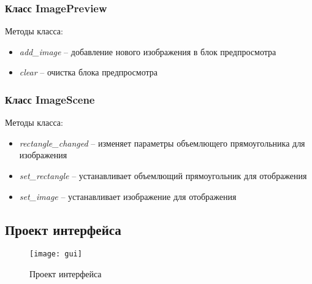 \subsubsection{Класс ImagePreview}
Методы класса:
\begin{itemize}
\item \textit{add\_image} -- добавление нового изображения в блок предпросмотра
\item \textit{clear} -- очистка блока предпросмотра
\end{itemize}

\subsubsection{Класс ImageScene}
Методы класса:
\begin{itemize}
\item \textit{rectangle\_changed} -- изменяет параметры объемлющего прямоугольника для изображения
\item \textit{set\_rectangle} -- устанавливает объемлющий прямоугольник для отображения
\item \textit{set\_image} -- устанавливает изображение для отображения
\end{itemize}

\subsection{Проект интерфейса}
\renewcommand{\figurename}{Рис.}
\begin{figure}[h]
\center
\texttt{[image: gui]}
\caption{Проект интерфейса}
\end{figure}

